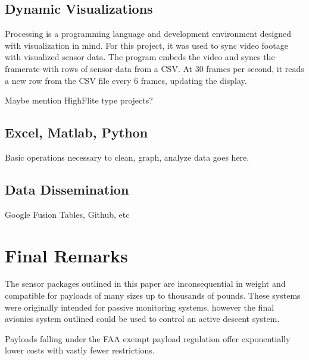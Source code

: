 \documentclass[heading.tex]{subfiles}
\begin{document}
\subsection{Dynamic Visualizations}

Processing is a programming language and development environment designed
with visualization in mind. For this project, it was used to sync video
footage with visualized sensor data. The program embeds the video and syncs
the framerate with rows of sensor data from a CSV. At 30 frames per second,
it reads a new row from the CSV file every 6 frames, updating the display.

Maybe mention HighFlite type projects?

\subsection{Excel, Matlab, Python}

Basic operations necessary to clean, graph, analyze data goes here.

\subsection{Data Dissemination}

Google Fusion Tables, Github, etc

\section{Final Remarks}
The sensor packages outlined in this paper are inconsequential in weight and
compatible for payloads of many sizes up to thousands of pounds.
These systems were originally intended for passive monitoring systems, however the final avionics system outlined could be used to control an active descent system.

Payloads falling under the FAA exempt payload regulation offer exponentially
lower costs with vastly fewer restrictions. 
\end{document}
